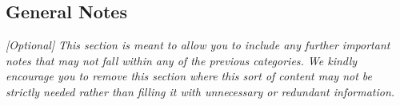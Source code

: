 \subsection{General Notes}
\label{sec:gnotes}
{\em [Optional]}
\textit{This section is meant to allow you to include any further important notes that may not fall within any of the previous categories. We kindly encourage you to remove this section where this sort of content may not be strictly needed rather than filling it with unnecessary or redundant information.}

